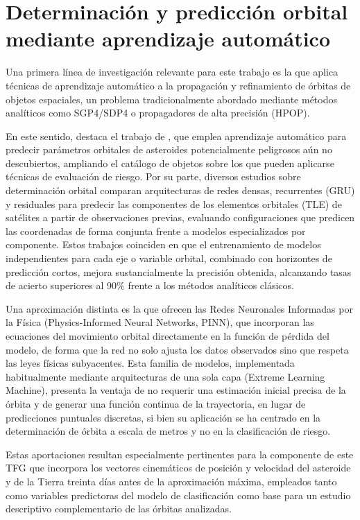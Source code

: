 \documentclass[12pt]{report} %
\begin{document}
\section{Determinación y predicción orbital mediante aprendizaje automático}

Una primera línea de investigación relevante para este trabajo es la que aplica técnicas de aprendizaje automático a la propagación y refinamiento de órbitas de objetos espaciales, un problema tradicionalmente abordado mediante métodos analíticos como SGP4/SDP4 o propagadores de alta precisión (HPOP).

En este sentido, destaca el trabajo de \cite{pasko2018prediction}, que emplea aprendizaje automático para predecir parámetros orbitales de asteroides potencialmente peligrosos aún no descubiertos, ampliando el catálogo de objetos sobre los que pueden aplicarse técnicas de evaluación de riesgo. Por su parte, diversos estudios sobre determinación orbital comparan arquitecturas de redes densas, recurrentes (GRU) y residuales para predecir las componentes de los elementos orbitales (TLE) de satélites a partir de observaciones previas, evaluando configuraciones que predicen las coordenadas de forma conjunta frente a modelos especializados por componente. Estos trabajos coinciden en que el entrenamiento de modelos independientes para cada eje o variable orbital, combinado con horizontes de predicción cortos, mejora sustancialmente la precisión obtenida, alcanzando tasas de acierto superiores al 90\% frente a los métodos analíticos clásicos.

Una aproximación distinta es la que ofrecen las Redes Neuronales Informadas por la Física (Physics-Informed Neural Networks, PINN), que incorporan las ecuaciones del movimiento orbital directamente en la función de pérdida del modelo, de forma que la red no solo ajusta los datos observados sino que respeta las leyes físicas subyacentes. Esta familia de modelos, implementada habitualmente mediante arquitecturas de una sola capa (Extreme Learning Machine), presenta la ventaja de no requerir una estimación inicial precisa de la órbita y de generar una función continua de la trayectoria, en lugar de predicciones puntuales discretas, si bien su aplicación se ha centrado en la determinación de órbita a escala de metros y no en la clasificación de riesgo.

Estas aportaciones resultan especialmente pertinentes para la componente de este TFG que incorpora los vectores cinemáticos de posición y velocidad del asteroide y de la Tierra treinta días antes de la aproximación máxima, empleados tanto como variables predictoras del modelo de clasificación como base para un estudio descriptivo complementario de las órbitas analizadas.
\end{document}
